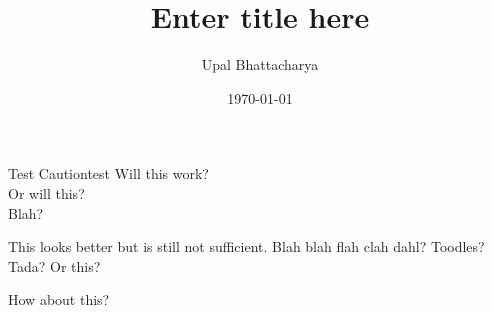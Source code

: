 \documentclass[a4paper]{article}
\author{Upal Bhattacharya}
\date{\today}
\title{Enter title here}
\begin{document}
\maketitle

\linenumbers
\begin{linenomath*}
\begin{caution}{Test Caution}{test}
  Will this work? \\
  Or will this? \\
  Blah?
\end{caution}
\end{linenomath*}

This looks better but is still not sufficient. Blah blah flah clah dahl? Toodles?
Tada? Or this?

How about this?
\end{document}
